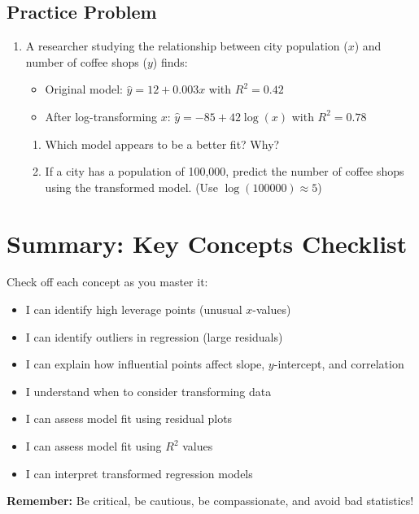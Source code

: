\documentclass[11pt]{article}
\begin{document}
\subsection*{Practice Problem}
\begin{enumerate}[resume, label=\arabic*.]
\item A researcher studying the relationship between city population ($x$) and number of coffee shops ($y$) finds:
\begin{itemize}
\item Original model: $\hat{y} = 12 + 0.003x$ with $R^2 = 0.42$
\item After log-transforming $x$: $\hat{y} = -85 + 42\log(x)$ with $R^2 = 0.78$
\end{itemize}

\begin{enumerate}[label=\alph*)]
\item Which model appears to be a better fit? Why?

\vspace{1.5em}

\item If a city has a population of 100,000, predict the number of coffee shops using the transformed model. (Use $\log(100000) \approx 5$)

\vspace{2em}
\end{enumerate}
\end{enumerate}

\section*{Summary: Key Concepts Checklist}

Check off each concept as you master it:

\begin{itemize}
\item[$\square$] I can identify high leverage points (unusual $x$-values)
\item[$\square$] I can identify outliers in regression (large residuals)
\item[$\square$] I can explain how influential points affect slope, $y$-intercept, and correlation
\item[$\square$] I understand when to consider transforming data
\item[$\square$] I can assess model fit using residual plots
\item[$\square$] I can assess model fit using $R^2$ values
\item[$\square$] I can interpret transformed regression models
\end{itemize}

\vspace{1em}
\textbf{Remember:} Be critical, be cautious, be compassionate, and avoid bad statistics!
\end{document}
